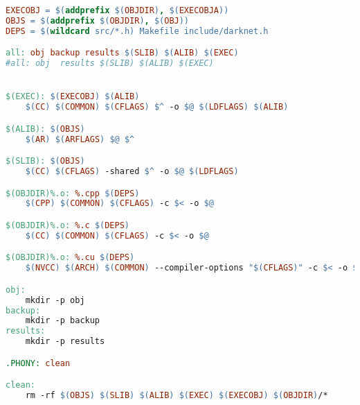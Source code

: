 \begin{lstlisting}[language=make]
EXECOBJ = $(addprefix $(OBJDIR), $(EXECOBJA))
OBJS = $(addprefix $(OBJDIR), $(OBJ))
DEPS = $(wildcard src/*.h) Makefile include/darknet.h

all: obj backup results $(SLIB) $(ALIB) $(EXEC)
#all: obj  results $(SLIB) $(ALIB) $(EXEC)


$(EXEC): $(EXECOBJ) $(ALIB)
    $(CC) $(COMMON) $(CFLAGS) $^ -o $@ $(LDFLAGS) $(ALIB)

$(ALIB): $(OBJS)
    $(AR) $(ARFLAGS) $@ $^

$(SLIB): $(OBJS)
    $(CC) $(CFLAGS) -shared $^ -o $@ $(LDFLAGS)

$(OBJDIR)%.o: %.cpp $(DEPS)
    $(CPP) $(COMMON) $(CFLAGS) -c $< -o $@

$(OBJDIR)%.o: %.c $(DEPS)
    $(CC) $(COMMON) $(CFLAGS) -c $< -o $@

$(OBJDIR)%.o: %.cu $(DEPS)
    $(NVCC) $(ARCH) $(COMMON) --compiler-options "$(CFLAGS)" -c $< -o $@

obj:
    mkdir -p obj
backup:
    mkdir -p backup
results:
    mkdir -p results

.PHONY: clean

clean:
    rm -rf $(OBJS) $(SLIB) $(ALIB) $(EXEC) $(EXECOBJ) $(OBJDIR)/*    
\end{lstlisting}

